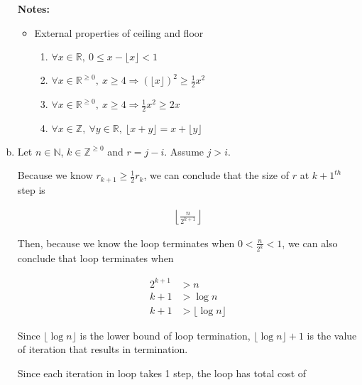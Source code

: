 \documentclass[12pt]{article}
\begin{document}
\begin{enumerate}[a.]
    \bigskip

    \textbf{Notes:}

    \begin{itemize}
        \item External properties of ceiling and floor

        \begin{enumerate}[1.]
            \item $\forall x \in \mathbb{R},\: 0 \leq x - \lfloor x \rfloor < 1$
            \item $\forall x \in \mathbb{R}^{\geq 0},\:x \geq 4 \Rightarrow (\lfloor x \rfloor)^2 \geq \frac{1}{2}x^2$
            \item $\forall x \in \mathbb{R}^{\geq 0},\:x \geq 4 \Rightarrow \frac{1}{2}x^2 \geq 2x$
            \item $\forall x \in \mathbb{Z},\:\forall y \in \mathbb{R},\:\lfloor x+y \rfloor = x + \lfloor y \rfloor$
        \end{enumerate}
    \end{itemize}

    \item

    Let $n \in \mathbb{N}$, $k \in \mathbb{Z}^{\geq 0}$ and $r = j - i$.
    Assume $j > i$.

    Because we know $r_{k+1} \geq \frac{1}{2}r_k$, we can conclude that the
    size of $r$ at $k+1^{th}$ step is

    \setcounter{equation}{0}
    \begin{align}
        \left\lfloor \frac{n}{2^{k+1}} \right\rfloor
    \end{align}

    \bigskip

    Then, because we know the loop terminates when $0 < \frac{n}{2^k} < 1$, we can
    also conclude that loop terminates when

    \begin{align}
        2^{k+1} &> n\\
        k + 1 &> \log n\\
        k + 1 &> \lfloor \log n \rfloor
    \end{align}

    \bigskip

    Since $\lfloor \log n \rfloor$ is the lower bound of loop termination,
    $\lfloor \log n \rfloor + 1$ is the value of iteration that results in termination.

    \bigskip

    Since each iteration in loop takes 1 step, the loop has total cost of


\end{enumerate}
\end{document}
